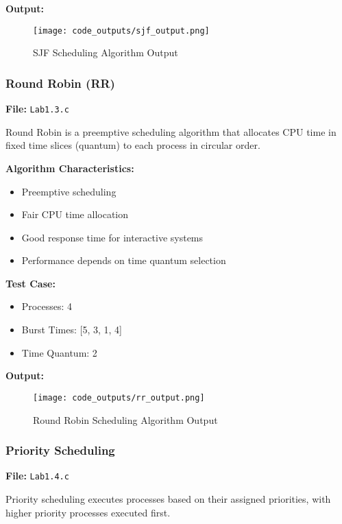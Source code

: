 \documentclass[12pt,a4paper]{article}
\begin{document}
\textbf{Output:}
\begin{figure}[H]
    \centering
    \texttt{[image: code\_outputs/sjf\_output.png]}
    \caption{SJF Scheduling Algorithm Output}
    \label{fig:sjf_output}
\end{figure}

\vspace{3cm}

\subsubsection{Round Robin (RR)}
\textbf{File:} \texttt{Lab1.3.c}

Round Robin is a preemptive scheduling algorithm that allocates CPU time in fixed time slices (quantum) to each process in circular order.

\textbf{Algorithm Characteristics:}
\begin{itemize}
    \item Preemptive scheduling
    \item Fair CPU time allocation
    \item Good response time for interactive systems
    \item Performance depends on time quantum selection
\end{itemize}

\textbf{Test Case:}
\begin{itemize}
    \item Processes: 4
    \item Burst Times: [5, 3, 1, 4]
    \item Time Quantum: 2
\end{itemize}

\textbf{Output:}
\begin{figure}[H]
    \centering
    \texttt{[image: code\_outputs/rr\_output.png]}
    \caption{Round Robin Scheduling Algorithm Output}
    \label{fig:rr_output}
\end{figure}

\vspace{3cm}

\subsubsection{Priority Scheduling}
\textbf{File:} \texttt{Lab1.4.c}

Priority scheduling executes processes based on their assigned priorities, with higher priority processes executed first.
\end{document}
